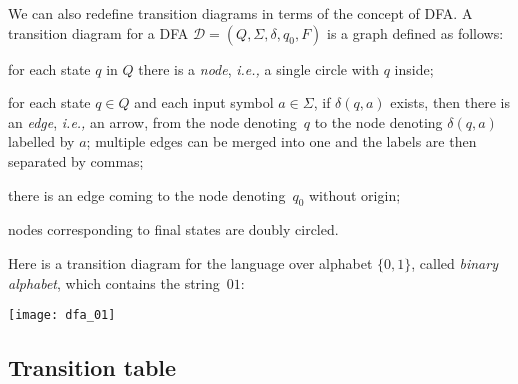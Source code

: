 We can also redefine transition diagrams in terms of the concept of
DFA. A transition diagram for a DFA \(\mathcal{D} = (Q, \Sigma,
\delta, q_0, F)\) is a graph defined as follows:
\begin{enumerate*}

  \item for each state \(q\) in \(Q\) there is a \emph{node}, \emph{i.e.,} a
    single circle with \(q\) inside;

  \item for each state \(q \in Q\) and each input symbol \(a \in
    \Sigma\), if \(\delta (q, a)\) exists, then there is an
    \emph{edge}, \emph{i.e.,} an arrow, from the node denoting~\(q\) to the
    node denoting \(\delta (q, a)\) labelled by \(a\); multiple edges
    can be merged into one and the labels are then separated by
    commas;

  \item there is an edge coming to the node denoting~\(q_0\) without
    origin;

  \item nodes corresponding to final states are doubly circled.

\end{enumerate*}
Here is a transition diagram for the language over alphabet \(\{0,
1\}\), called \emph{binary alphabet}, which contains the
string~\(01\):
\begin{center}
\texttt{[image: dfa\_01]}
\end{center}

\subsection*{Transition table}

